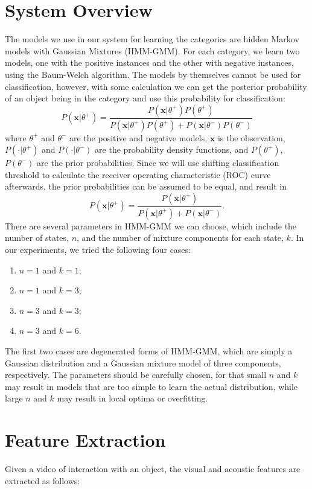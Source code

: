 \documentclass[12pt,final,twoside]{report}
\theoremstyle{plain}
\theoremstyle{definition}
\theoremstyle{remark}
\begin{document}
\section{System Overview}
The models we use in our system for learning the categories are hidden Markov models with Gaussian Mixtures (HMM-GMM). For each category, we learn two models, one with the positive instances and the other with negative instances, using the Baum-Welch algorithm. The models by themselves cannot be used for classification, however, with some calculation we can get the posterior probability of an object being in the category and use this probability for classification:
\begin{equation}
  P(\mathbf{x}|\theta^+) = \frac{P(\mathbf{x}|\theta^+)P(\theta^+)}{P(\mathbf{x}|\theta^+)P(\theta^+) + P(\mathbf{x}|\theta^-)P(\theta^-)}
\end{equation}
where $\theta^+$ and $\theta^-$ are the positive and negative models, $\mathbf{x}$ is the observation, $P(\cdot|\theta^+)$ and $P(\cdot|\theta^-)$ are the probability density functions, and $P(\theta^+)$, $P(\theta^-)$ are the prior probabilities. Since we will use shifting classification threshold to calculate the receiver operating characteristic (ROC) curve afterwards, the prior probabilities can be assumed to be equal, and result in
\begin{equation}
  P(\mathbf{x}|\theta^+) = \frac{P(\mathbf{x}|\theta^+)}{P(\mathbf{x}|\theta^+) + P(\mathbf{x}|\theta^-)} .
\end{equation}
There are several parameters in HMM-GMM we can choose, which include the number of states, $n$, and the number of mixture components for each state, $k$. In our experiments, we tried the following four cases:
\begin{enumerate}
  \item $n = 1$ and $k = 1$;
  \item $n = 1$ and $k = 3$;
  \item $n = 3$ and $k = 3$;
  \item $n = 3$ and $k = 6$.
\end{enumerate}
The first two cases are degenerated forms of HMM-GMM, which are simply a Gaussian distribution and a Gaussian mixture model of three components, respectively. The parameters should be carefully chosen, for that small $n$ and $k$ may result in models that are too simple to learn the actual distribution, while large $n$ and $k$ may result in local optima or overfitting.

\section{Feature Extraction}
Given a video of interaction with an object, the visual and acoustic features are extracted as follows:
\end{document}
